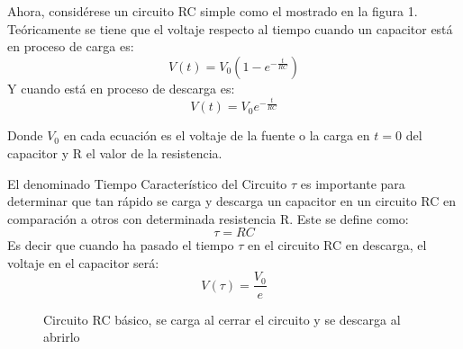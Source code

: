 \documentclass[10pt,letter]{article}
\begin{document}
\begin{multicols}{2}
\vspace{0.3cm}

Ahora, considérese un circuito RC simple como el mostrado en la figura 1. Teóricamente se tiene que el voltaje respecto al tiempo cuando un capacitor está en proceso de carga es:
\begin{equation}
V(t)=V_0\left(1-e^{-\frac{t}{RC}}\right)
\end{equation}
Y cuando está en proceso de descarga es:
\begin{equation}
V(t)=V_0e^{-\frac{t}{RC}}
\end{equation}

\vspace{0.3cm}

Donde $V_0$ en cada ecuación es el voltaje de la fuente o la carga en $t=0$ del capacitor y R el valor de la resistencia.

\vspace{0.2cm}

El denominado Tiempo Característico del Circuito $\tau$ es importante para determinar que tan rápido se carga y descarga un capacitor en un circuito RC en comparación a otros con determinada resistencia R. Este se define como:
\begin{equation}
\tau=RC
\end{equation}
Es decir que cuando ha pasado el tiempo $\tau$ en el circuito RC en descarga, el voltaje en el capacitor será:
\begin{equation}
V(\tau)=\dfrac{V_0}{e}
\end{equation}

\begin{figure}[H]
\centering
{}
\caption{Circuito RC básico, se carga al cerrar el circuito y se descarga al abrirlo}
\label{RCcarga}
\end{figure}




\end{multicols}
\end{document}

